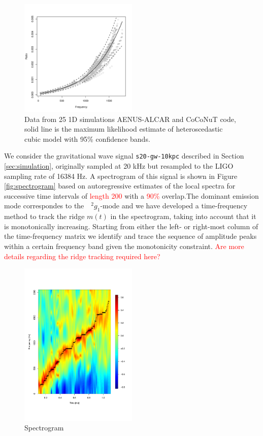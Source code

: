 \begin{figure}
 \centering
 \includegraphics[width=0.5\textwidth,height=0.3\textheight]{model.pdf}
 \caption{Data from 25 1D simulations {\sc AENUS-ALCAR } and {\sc CoCoNuT}  code, solid line is the maximum likelihood estimate of heteroscedastic cubic model with 95\% confidence bands.} \label{Fig:LMVAR}
\end{figure}

We consider the gravitational wave signal {\tt s20-gw-10kpc} described in Section \ref{sec:simulation}, originally sampled at 20 kHz but resampled to the LIGO sampling rate of 16384 Hz.
A spectrogram of this signal is shown in Figure \ref{fig:spectrogram} based on autoregressive estimates of the local spectra for successive time intervals of 
\textcolor{red}{length 200} with a \textcolor{red}{ 90\%} overlap.The dominant emission mode correspondes to the $\mbox{ }^2 g_1$-mode \cite{} and we have developed a time-frequency method to track the ridge $m(t)$ in the spectrogram, taking into account that it is monotonically increasing. Starting from either the left- or right-most column of the time-frequency  matrix we identify and trace the sequence of amplitude peaks within a certain frequency band given the monotonicity constraint. \textcolor{red}{Are more details regarding the ridge tracking required here?}

\begin{figure}
 \centering
 \includegraphics[width=0.5\textwidth,height=0.3\textheight]{plots/spectrogram.pdf}
 \caption{Spectrogram} \label{fig:spec}
\end{figure}




